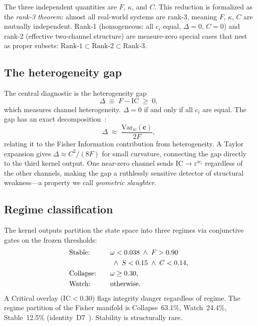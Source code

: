 \documentclass[
  aps,
  prd,
  twocolumn,
  superscriptaddress,
  nofootinbib,
  floatfix
]{revtex4-2}
\newcommand{\eps}{\varepsilon}
\newcommand{\beq}{\begin{equation}}
\newcommand{\eeq}{\end{equation}}
\newcommand{\tvec}{\mathbf{c}}
\newcommand{\IC}{\mathrm{IC}}
\begin{document}
\noindent The three independent quantities are $F$, $\kappa$, and $C$.
This reduction is formalized as the \emph{rank-3 theorem}: almost all
real-world systems are rank-3, meaning $F$, $\kappa$, $C$ are mutually
independent.  Rank-1 (homogeneous: all $c_i$ equal, $\Delta = 0$,
$C = 0$) and rank-2 (effective two-channel structure) are measure-zero
special cases that nest as proper subsets:
$\text{Rank-1} \subset \text{Rank-2} \subset \text{Rank-3}$.

\subsection{The heterogeneity gap}

The central diagnostic is the heterogeneity gap
\beq\label{eq:gap}
  \Delta \;\equiv\; F - \IC \;\geq\; 0,
\eeq
which measures channel heterogeneity.  $\Delta = 0$ if and only if all
$c_i$ are equal.  The gap has an exact
decomposition~\cite{paulus2025physicscoherence}:
\beq\label{eq:gap-fisher}
  \Delta \;\approx\; \frac{\mathrm{Var}_w(\tvec)}{2F},
\eeq
relating it to the Fisher Information contribution from heterogeneity.
A Taylor expansion gives $\Delta \approx C^2/(8F)$ for small
curvature, connecting the gap directly to the third kernel output.
One near-zero channel sends $\IC \to \eps^{w_i}$ regardless of the
other channels, making the gap a ruthlessly sensitive detector of
structural weakness---a property we call \emph{geometric slaughter}.

\subsection{Regime classification}

The kernel outputs partition the state space into three regimes via
conjunctive gates on the frozen thresholds:
\begin{alignat}{2}
  &\text{Stable:} &\quad& \omega < 0.038 \;\wedge\; F > 0.90 \notag\\
    &&& \;\wedge\; S < 0.15 \;\wedge\; C < 0.14, \notag\\
  &\text{Collapse:} && \omega \geq 0.30, \label{eq:regimes}\\
  &\text{Watch:} && \text{otherwise}. \notag
\end{alignat}
A Critical overlay ($\IC < 0.30$) flags integrity danger regardless
of regime.  The regime partition of the Fisher manifold is
Collapse~63.1\%, Watch~24.4\%, Stable~12.5\%
(identity~D7~\cite{umcpmetadatarepo}).  Stability is structurally
rare.
\end{document}
